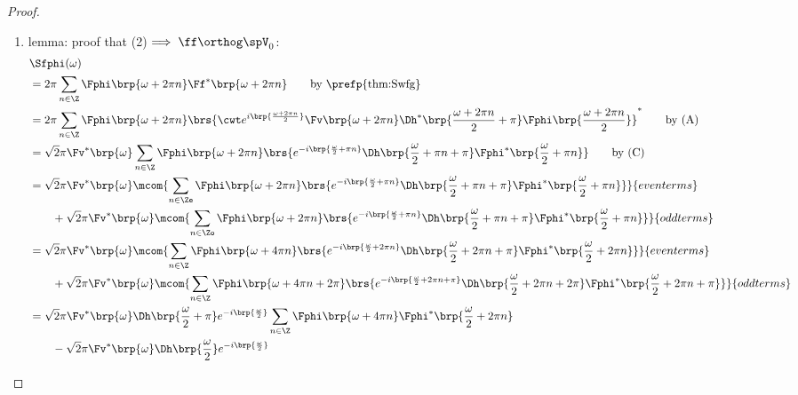 \begin{proof}
\begin{enumerate}
  \item lemma: proof that (2)$\implies\ff\orthog\spV_0$: \label{item:ortho_fW0_V0}
    \begin{align*}
      &\Sfphi(\omega)
      \\&= 2\pi\sum_{n\in\Z} \Fphi\brp{\omega + 2\pi n}\Ff^\ast\brp{\omega + 2\pi n}
        \qquad\text{by \prefp{thm:Swfg}}
      \\&= 2\pi\sum_{n\in\Z} \Fphi\brp{\omega + 2\pi n}
                             \brs{\cwt e^{i\brp{\frac{\omega + 2\pi n}{2}}}\Fv\brp{\omega + 2\pi n}\Dh^\ast\brp{\frac{\omega+2\pi n}{2}+\pi}\Fphi\brp{\frac{\omega+2\pi n}{2}}}^\ast
        \qquad\text{by (A)}
      \\&= \sqrt{2}\pi\Fv^\ast\brp{\omega}
           \sum_{n\in\Z} \Fphi\brp{\omega + 2\pi n}
                              \brs{e^{-i\brp{\frac{\omega}{2} + \pi n}}\Dh\brp{\frac{\omega}{2}+\pi n+\pi}\Fphi^\ast\brp{\frac{\omega}{2}+\pi n}}
        \qquad\text{by (C)}
      \\&= \sqrt{2}\pi\Fv^\ast\brp{\omega}
           \mcom{\sum_{n\in\Ze} \Fphi\brp{\omega + 2\pi n}
                         \brs{e^{-i\brp{\frac{\omega}{2} + \pi n}}\Dh\brp{\frac{\omega}{2}+\pi n+\pi}\Fphi^\ast\brp{\frac{\omega}{2}+\pi n}}}{even terms}
        \\&\qquad+ \sqrt{2}\pi\Fv^\ast\brp{\omega}
           \mcom{\sum_{n\in\Zo} \Fphi\brp{\omega + 2\pi n}
                         \brs{e^{-i\brp{\frac{\omega}{2} + \pi n}}\Dh\brp{\frac{\omega}{2}+\pi n+\pi}\Fphi^\ast\brp{\frac{\omega}{2}+\pi n}}}{odd terms}
      \\&= \sqrt{2}\pi\Fv^\ast\brp{\omega}
           \mcom{\sum_{n\in\Z} \Fphi\brp{\omega + 4\pi n}
                         \brs{e^{-i\brp{\frac{\omega}{2} + 2\pi n}}\Dh\brp{\frac{\omega}{2}+2\pi n+\pi}\Fphi^\ast\brp{\frac{\omega}{2}+2\pi n}}}{even terms}
        \\&\qquad+ \sqrt{2}\pi\Fv^\ast\brp{\omega}
           \mcom{\sum_{n\in\Z} \Fphi\brp{\omega + 4\pi n+2\pi}
                         \brs{e^{-i\brp{\frac{\omega}{2} + 2\pi n+\pi}}\Dh\brp{\frac{\omega}{2}+2\pi n+2\pi}\Fphi^\ast\brp{\frac{\omega}{2}+2\pi n+\pi}}}{odd terms}
      \\&= \sqrt{2}\pi\Fv^\ast\brp{\omega}\Dh\brp{\frac{\omega}{2}+\pi}e^{-i\brp{\frac{\omega}{2}}}
           \sum_{n\in\Z} \Fphi\brp{\omega + 4\pi n}
                         \Fphi^\ast\brp{\frac{\omega}{2}+2\pi n}
        \\&\qquad- \sqrt{2}\pi\Fv^\ast\brp{\omega}\Dh\brp{\frac{\omega}{2}}e^{-i\brp{\frac{\omega}{2}}}

\end{align*}
\end{enumerate}
\end{proof}
